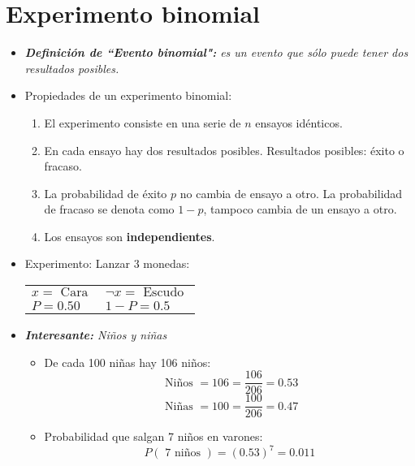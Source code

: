 \section{Experimento binomial}
\begin{itemize}
    \item \emph{\textbf{Definición de ``Evento binomial":} es un evento que sólo puede tener dos resultados posibles.}
    \item Propiedades de un experimento binomial:
        \begin{enumerate}
            \item El experimento consiste en una serie de $n$ ensayos idénticos.
            \item En cada ensayo hay dos resultados posibles. Resultados posibles: éxito o fracaso.
            \item La probabilidad de éxito $p$ no cambia de ensayo a otro. La probabilidad de fracaso se denota como $1-p$, tampoco cambia de un ensayo a otro.
            \item Los ensayos son \textbf{independientes}.
        \end{enumerate}
    
    \item Experimento: Lanzar 3 monedas:
        \begin{center}
           \begin{tabular}{ | p{5cm} | p{5cm} |  }
               \hline
                    $x = \text{  Cara  }$ & $\neg x = \text{  Escudo  }$   \\
                    $P=0.50$ & $1-P = 0.5$ \\ 
               \hline
           \end{tabular}
        \end{center}
    
    \item \emph{\textbf{Interesante:} Niños y niñas}
        \begin{itemize}
            \item De cada 100 niñas hay 106 niños:
             \[
                \text{  Niños  }=106 = \frac{106}{206} = 0.53
             \]
             \[
                \text{  Niñas  }=100 = \frac{100}{206} = 0.47
             \]
             
             \item Probabilidad que salgan 7 niños en varones:
                \[
                  P(\text{  7 niños  }) = (0.53)^7 = 0.011
                \]
        \end{itemize}
    

\end{itemize}
